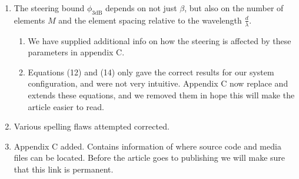 \documentclass[11pt]{article} %
\newcommand\1{\vec 1}
\begin{document}
\begin{enumerate}
\item The steering bound $\phi_\mathrm{3dB}$ depends on not just $\beta$, but also on the number of elements $M$ and the element spacing relative to the wavelength $\frac{d}{\lambda}$. 
\begin{enumerate}
\item We have supplied additional info on how the steering is affected by these parameters in appendix C.
\item Equations (12) and (14) only gave the correct results for our system configuration, and were not very intuitive. Appendix C now replace and extends these equations, and we removed them in hope this will make the article easier to read.
\end{enumerate}
\item Various spelling flaws attempted corrected.
\item Appendix C added. Contains information of where source code and media files can be located. Before the article goes to publishing we will make sure that this link is permanent.
\end{enumerate}
\end{document}
